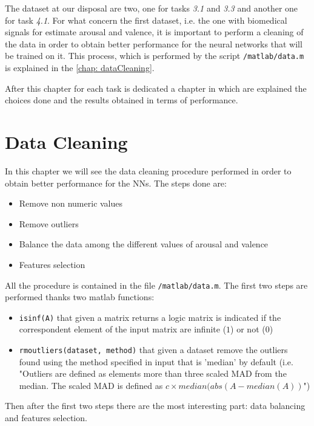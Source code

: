\documentclass[a4paper]{report}
\begin{document}
	\noindent The dataset at our disposal are two, one for tasks \textit{3.1} and \textit{3.3} and another one for task \textit{4.1}.
	\noindent For what concern the first dataset, i.e. the one with biomedical signals for estimate arousal and valence, it is important to perform a cleaning of the data in order to obtain better performance for the neural networks that will be trained on it. This process, which is performed by the script \texttt{/matlab/data.m} is explained in the \autoref{chap: dataCleaning}. 
	
	\noindent After this chapter for each task is dedicated a chapter in which are explained the choices done and the results obtained in terms of performance.
	
\chapter{Data Cleaning}
	\label{chap: dataCleaning}
	\noindent In this chapter we will see the data cleaning procedure performed in order to obtain better performance for the NNs. The steps done are:
	\begin{itemize}
		\item Remove non numeric values
		\item Remove outliers
		\item Balance the data among the different values of arousal and valence
		\item Features selection
	\end{itemize}
	\noindent All the procedure is contained in the file \texttt{/matlab/data.m}. The first two steps are performed thanks two matlab functions:
	\begin{itemize}
		\item \texttt{isinf(A)} that given a matrix returns a logic matrix is indicated if the correspondent element of the input matrix are infinite ($1$) or not ($0$) 
		
		\item \texttt{rmoutliers(dataset, method)} that given a dataset remove the outliers found using the method specified in input that is 'median' by default (i.e. "Outliers are defined as elements more than three scaled MAD from the median. The scaled MAD is defined as $c\times median(abs(A-median(A))$")
	\end{itemize} 
	
	\noindent Then after the first two steps there are the most interesting part: data balancing and features selection.
	
	\newpage
\end{document}
